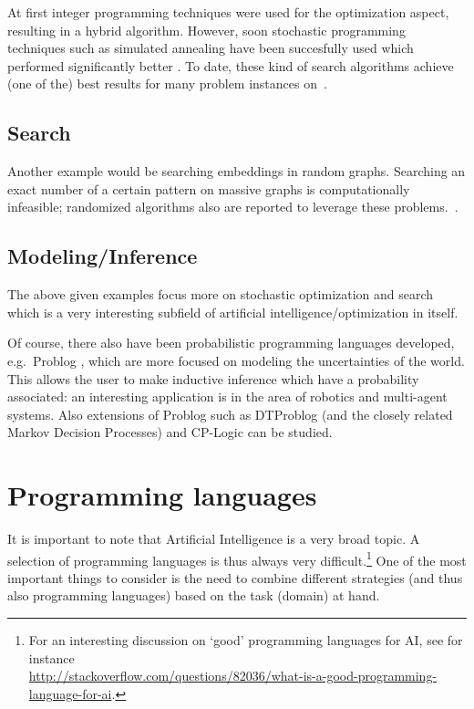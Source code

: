 \documentclass[a4paper,11pt,english]{article}
\begin{document}
At first integer programming techniques \cite{combinedttp} were used for the optimization aspect, resulting in a hybrid algorithm. However, soon stochastic programming techniques such as simulated annealing \cite{simulatedannealing} have been succesfully used which performed significantly better \cite{ttpquan,paper,paper2}. To date, these kind of search algorithms achieve (one of the) best results for many problem instances on~\cite{website}.

\subsection*{Search}
Another example would be searching embeddings in random graphs. Searching an exact number of a certain pattern on massive graphs is computationally infeasible; randomized algorithms also are reported to leverage these problems.~\cite{Furer:2008:ACE:1429791.1429826,furerquan}.

\subsection*{Modeling/Inference}
The above given examples focus more on stochastic optimization and search which is a very interesting subfield of artificial intelligence/optimization in itself. 

Of course, there also have been probabilistic programming languages developed, e.g.~Problog \cite{problog}, which are more focused on modeling the uncertainties of the world. This allows the user to make inductive inference which have a probability associated: an interesting application is in the area of robotics \cite{golog} and multi-agent systems. Also extensions of Problog such as DTProblog \cite{dtproblog} (and the closely related Markov Decision Processes) and CP-Logic \cite{cplogic} can be studied.


\section{Programming languages}
It is important to note that Artificial Intelligence is a very broad topic. A selection of programming languages is thus always very difficult.\footnote{For an interesting discussion on `good' programming languages for AI, see for instance\\ \url{http://stackoverflow.com/questions/82036/what-is-a-good-programming-language-for-ai}.} One of the most important things to consider is the need to combine different strategies (and thus also programming languages) \cite{progai,Neumann1} based on the task (domain) at hand.
 
\end{document}

